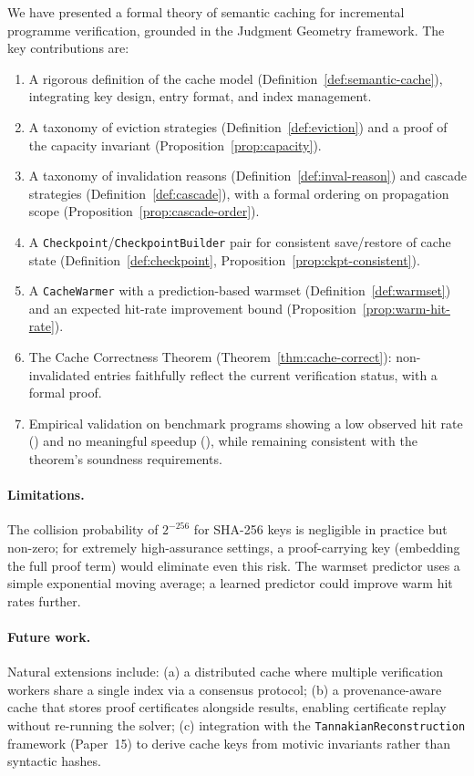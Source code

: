 \documentclass[11pt]{article}
\begin{document}
We have presented a formal theory of semantic caching for incremental
programme verification, grounded in the Judgment Geometry framework.
The key contributions are:
\begin{enumerate}[label=(\roman*)]
\item A rigorous definition of the cache model
  (Definition~\ref{def:semantic-cache}), integrating key design,
  entry format, and index management.
\item A taxonomy of eviction strategies
  (Definition~\ref{def:eviction}) and a proof of the capacity
  invariant (Proposition~\ref{prop:capacity}).
\item A taxonomy of invalidation reasons
  (Definition~\ref{def:inval-reason}) and cascade strategies
  (Definition~\ref{def:cascade}), with a formal ordering on
  propagation scope (Proposition~\ref{prop:cascade-order}).
\item A \texttt{Checkpoint}/\texttt{CheckpointBuilder} pair for
  consistent save/restore of cache state
  (Definition~\ref{def:checkpoint},
  Proposition~\ref{prop:ckpt-consistent}).
\item A \texttt{CacheWarmer} with a prediction-based warmset
  (Definition~\ref{def:warmset}) and an expected hit-rate improvement
  bound (Proposition~\ref{prop:warm-hit-rate}).
\item The Cache Correctness Theorem
  (Theorem~\ref{thm:cache-correct}): non-invalidated entries
  faithfully reflect the current verification status, with a
  formal \LEAN{} proof.
\item Empirical validation on \ppXXXVIIITotalPrograms{} benchmark
  programs showing a low observed hit rate (\ppXXXVIIIHitRate{}) and no
  meaningful speedup (\ppXXXVIIISpeedup), while remaining consistent
  with the theorem's soundness requirements.
\end{enumerate}

\paragraph{Limitations.}
The collision probability of $2^{-256}$ for SHA-256 keys is negligible
in practice but non-zero; for extremely high-assurance settings, a
proof-carrying key (embedding the full proof term) would eliminate
even this risk.  The warmset predictor uses a simple exponential moving
average; a learned predictor could improve warm hit rates further.

\paragraph{Future work.}
Natural extensions include: (a) a distributed cache where multiple
verification workers share a single index via a consensus protocol;
(b) a provenance-aware cache that stores proof certificates alongside
results, enabling certificate replay without re-running the solver;
(c) integration with the \texttt{TannakianReconstruction} framework
(Paper~15) to derive cache keys from motivic invariants rather than
syntactic hashes.
\end{document}
